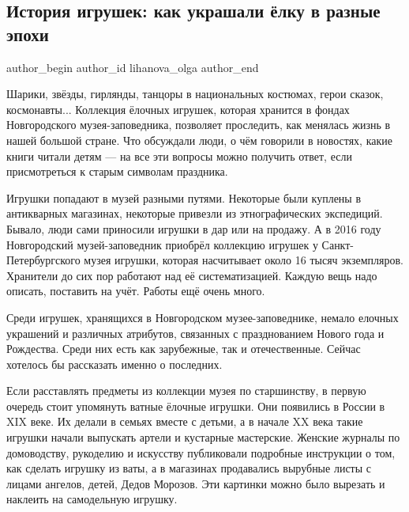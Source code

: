  
 
 
 
 
\subsection{История игрушек: как украшали ёлку в разные эпохи}
\label{sec:24_12_2021.stz.news.ru.novgorod.1.istoria_igrushek}

\ifcmt
 author_begin
   author_id lihanova_olga
 author_end
\fi


\begin{zznagolos}
Шарики, звёзды, гирлянды, танцоры в национальных костюмах, герои сказок,
космонавты... Коллекция ёлочных игрушек, которая хранится в фондах
Новгородского музея-заповедника, позволяет проследить, как менялась жизнь в
нашей большой стране. Что обсуждали люди, о чём говорили в новостях, какие
книги читали детям — на все эти вопросы можно получить ответ, если
присмотреться к старым символам праздника.
\end{zznagolos}

Игрушки попадают в музей разными путями. Некоторые были куплены в антикварных
магазинах, некоторые привезли из этнографических экспедиций. Бывало, люди сами
приносили игрушки в дар или на продажу. А в 2016 году Новгородский
музей-заповедник приобрёл коллекцию игрушек у Санкт-Петербургского музея
игрушки, которая насчитывает около 16 тысяч экземпляров. Хранители до сих пор
работают над её систематизацией. Каждую вещь надо описать, поставить на учёт.
Работы ещё очень много.

Среди игрушек, хранящихся в Новгородском музее-заповеднике, немало елочных
украшений и различных атрибутов, связанных с празднованием Нового года и
Рождества. Среди них есть как зарубежные, так и отечественные. Сейчас хотелось
бы рассказать именно о последних. 

Если расставлять предметы из коллекции музея по старшинству, в первую очередь
стоит упомянуть ватные ёлочные игрушки. Они появились в России в XIX веке. Их
делали в семьях вместе с детьми, а в начале XX века такие игрушки начали
выпускать артели и кустарные мастерские. Женские журналы по домоводству,
рукоделию и искусству публиковали подробные инструкции о том, как сделать
игрушку из ваты, а в магазинах продавались вырубные листы с лицами ангелов,
детей, Дедов Морозов. Эти картинки можно было вырезать и наклеить на
самодельную игрушку. 

